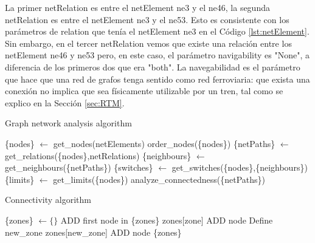    La primer netRelation es entre el netElement ne3 y el ne46, la segunda netRelation es entre el netElement ne3 y el ne53. Esto es consistente con los parámetros de relation que tenía el netElement ne3 en el Código \ref{lst:netElement}. Sin embargo, en el tercer netRelation vemos que existe una relación entre los netElement ne46 y ne53 pero, en este caso, el parámetro navigability es "None", a diferencia de los primeros dos que era "both". La navegabilidad es el parámetro que hace que una red de grafos tenga sentido como red ferroviaria: que exista una conexión no implica que sea físicamente utilizable por un tren, tal como se explico en la Sección \ref{sec:RTM}.
    


        \begin{algorithm}
            \caption{Graph network analysis algorithm}
            \label{alg:graph_network}
            \begin{algorithmic}
                \STATE \{nodes\} $\gets$ get\_nodes(netElements)
                \STATE  order\_nodes(\{nodes\})
                \STATE \{netPaths\} $\gets$ get\_relations(\{nodes\},netRelations)
                \STATE \{neighbours\} $\gets$ get\_neighbours(\{netPaths\})
                \STATE \{switches\} $\gets$ get\_switches(\{nodes\},\{neighbours\})
                \STATE \{limits\} $\gets$ get\_limits(\{nodes\})
                \STATE analyze\_connectedness(\{netPaths\})
            \end{algorithmic}
        \end{algorithm}


\begin{algorithm}
            \label{alg:connectedness}
            \caption{Connectivity algorithm}
            \begin{algorithmic}
                \STATE \{zones\} $\gets \{ \}$
                \STATE ADD first node in \{zones\}
                                \STATE zones[zone] ADD node
                            \ELSE
                                \STATE Define new\_zone
                                \STATE zones[new\_zone] ADD node
                            \ENDIF
                        \ENDIF
                    \ENDFOR
                \ENDFOR 
            \RETURN \{zones\}
            \end{algorithmic}
        \end{algorithm}

